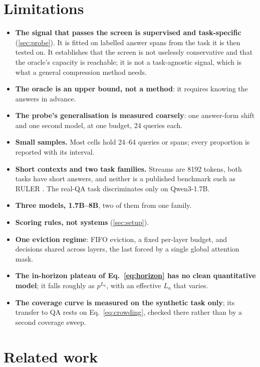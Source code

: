 \documentclass[10pt]{article}
\begin{document}
\section{Limitations}\label{sec:limits}

\begin{itemize}\itemsep2pt
\item \textbf{The signal that passes the screen is supervised and
      task-specific} (\cref{sec:probe}). It is fitted on labelled answer spans
      from the task it is then tested on. It establishes that the screen is not
      uselessly conservative and that the oracle's capacity is reachable; it is
      not a task-agnostic signal, which is what a general compression method
      needs.
\item \textbf{The oracle is an upper bound, not a method}: it requires knowing
      the answers in advance.
\item \textbf{The probe's generalisation is measured coarsely}: one answer-form
      shift and one second model, at one budget, 24 queries each.
\item \textbf{Small samples.} Most cells hold 24--64 queries or spans; every
      proportion is reported with its interval.
\item \textbf{Short contexts and two task families.} Streams are 8192 tokens,
      both tasks have short answers, and neither is a published benchmark such
      as RULER \citep{hsieh2024ruler}. The real-QA task discriminates only on
      Qwen3-1.7B.
\item \textbf{Three models, 1.7B--8B}, two of them from one family.
\item \textbf{Scoring rules, not systems} (\cref{sec:setup}).
\item \textbf{One eviction regime}: FIFO eviction, a fixed per-layer budget,
      and decisions shared across layers, the last forced by a single global
      attention mask.
\item \textbf{The in-horizon plateau of Eq.~\eqref{eq:horizon} has no clean
      quantitative model}; it falls roughly as $p^{L_a}$, with an effective
      $L_a$ that varies.
\item \textbf{The coverage curve is measured on the synthetic task only}; its
      transfer to QA rests on Eq.~\eqref{eq:crowding}, checked there rather
      than by a second coverage sweep.
\end{itemize}

\section{Related work}\label{sec:related}
\end{document}
